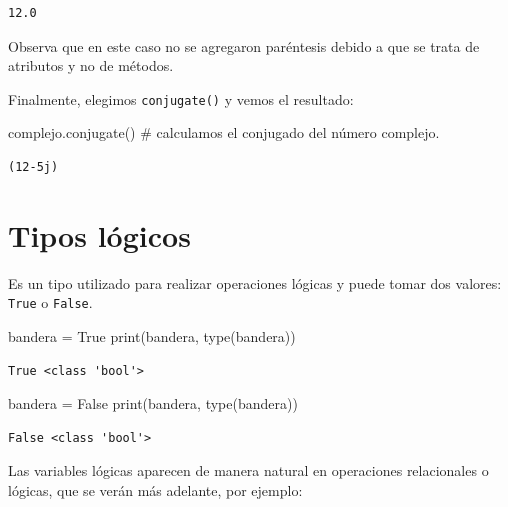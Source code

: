 \documentclass[
  spanish,
  letterpaper,
]{scrbook}
\newenvironment{Shaded}{\begin{snugshade}}{\end{snugshade}}
\newcommand{\BuiltInTok}[1]{\textcolor[rgb]{0.00,0.23,0.31}{#1}}
\newcommand{\CommentTok}[1]{\textcolor[rgb]{0.37,0.37,0.37}{#1}}
\newcommand{\NormalTok}[1]{\textcolor[rgb]{0.00,0.23,0.31}{#1}}
\newcommand{\OperatorTok}[1]{\textcolor[rgb]{0.37,0.37,0.37}{#1}}
\newcommand{\VariableTok}[1]{\textcolor[rgb]{0.07,0.07,0.07}{#1}}
\theoremstyle{definition}
\theoremstyle{remark}
\begin{document}
\begin{verbatim}
12.0
\end{verbatim}

Observa que en este caso no se agregaron paréntesis debido a que se
trata de atributos y no de métodos.

Finalmente, elegimos \texttt{conjugate()} y vemos el resultado:

\begin{Shaded}
\begin{Highlighting}[]
\NormalTok{complejo.conjugate() }\CommentTok{\# calculamos el conjugado del número complejo.}
\end{Highlighting}
\end{Shaded}

\begin{verbatim}
(12-5j)
\end{verbatim}

\section{Tipos lógicos}\label{tipos-luxf3gicos}

Es un tipo utilizado para realizar operaciones lógicas y puede tomar dos
valores: \texttt{True} o \texttt{False}.

\begin{Shaded}
\begin{Highlighting}[]
\NormalTok{bandera }\OperatorTok{=} \VariableTok{True}
\BuiltInTok{print}\NormalTok{(bandera, }\BuiltInTok{type}\NormalTok{(bandera))}
\end{Highlighting}
\end{Shaded}

\begin{verbatim}
True <class 'bool'>
\end{verbatim}

\begin{Shaded}
\begin{Highlighting}[]
\NormalTok{bandera }\OperatorTok{=} \VariableTok{False}
\BuiltInTok{print}\NormalTok{(bandera, }\BuiltInTok{type}\NormalTok{(bandera))}
\end{Highlighting}
\end{Shaded}

\begin{verbatim}
False <class 'bool'>
\end{verbatim}

Las variables lógicas aparecen de manera natural en operaciones
relacionales o lógicas, que se verán más adelante, por ejemplo:
\end{document}
